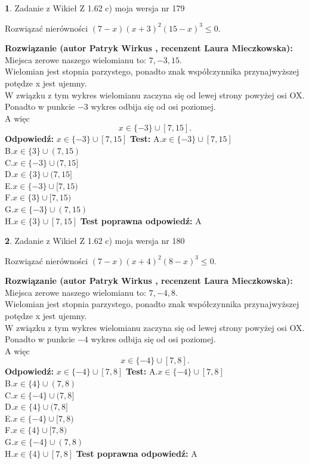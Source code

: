 \documentclass[12pt, a4paper]{article}
\theoremstyle{definition} %
\newtheorem{zad}{}
\newcommand{\zadStart}[1]{\begin{zad}#1\newline}
\newcommand{\zadStop}{\end{zad}}
\newcommand{\rozwStart}[2]{\noindent \textbf{Rozwiązanie (autor #1 , recenzent #2): }\newline}
\newcommand{\rozwStop}{\newline}
\newcommand{\odpStart}{\noindent \textbf{Odpowiedź:}\newline}
\newcommand{\odpStop}{\newline}
\newcommand{\testStart}{\noindent \textbf{Test:}\newline}
\newcommand{\testStop}{\newline}
\newcommand{\kluczStart}{\noindent \textbf{Test poprawna odpowiedź:}\newline}
\newcommand{\kluczStop}{\newline}
\begin{document}
\zadStart{Zadanie z Wikieł Z 1.62 c) moja wersja nr 179}

Rozwiązać nierówności $(7-x)(x+3)^{2}(15-x)^{3}\le0$.
\zadStop
\rozwStart{Patryk Wirkus}{Laura Mieczkowska}
Miejsca zerowe naszego wielomianu to: $7, -3, 15$.\\
Wielomian jest stopnia parzystego, ponadto znak współczynnika przy\linebreak najwyższej potędze x jest ujemny.\\ W związku z tym wykres wielomianu zaczyna się od lewej strony powyżej osi OX.\\
Ponadto w punkcie $-3$ wykres odbija się od osi poziomej.\\
A więc $$x \in \{-3\} \cup [7,15].$$
\rozwStop
\odpStart
$x \in \{-3\} \cup [7,15]$
\odpStop
\testStart
A.$x \in \{-3\} \cup [7,15]$\\
B.$x \in \{3\} \cup (7,15)$\\
C.$x \in \{-3\} \cup (7,15]$\\
D.$x \in \{3\} \cup (7,15]$\\
E.$x \in \{-3\} \cup [7,15)$\\
F.$x \in \{3\} \cup [7,15)$\\
G.$x \in \{-3\} \cup (7,15)$\\
H.$x \in \{3\} \cup [7,15]$
\testStop
\kluczStart
A
\kluczStop



\zadStart{Zadanie z Wikieł Z 1.62 c) moja wersja nr 180}

Rozwiązać nierówności $(7-x)(x+4)^{2}(8-x)^{3}\le0$.
\zadStop
\rozwStart{Patryk Wirkus}{Laura Mieczkowska}
Miejsca zerowe naszego wielomianu to: $7, -4, 8$.\\
Wielomian jest stopnia parzystego, ponadto znak współczynnika przy\linebreak najwyższej potędze x jest ujemny.\\ W związku z tym wykres wielomianu zaczyna się od lewej strony powyżej osi OX.\\
Ponadto w punkcie $-4$ wykres odbija się od osi poziomej.\\
A więc $$x \in \{-4\} \cup [7,8].$$
\rozwStop
\odpStart
$x \in \{-4\} \cup [7,8]$
\odpStop
\testStart
A.$x \in \{-4\} \cup [7,8]$\\
B.$x \in \{4\} \cup (7,8)$\\
C.$x \in \{-4\} \cup (7,8]$\\
D.$x \in \{4\} \cup (7,8]$\\
E.$x \in \{-4\} \cup [7,8)$\\
F.$x \in \{4\} \cup [7,8)$\\
G.$x \in \{-4\} \cup (7,8)$\\
H.$x \in \{4\} \cup [7,8]$
\testStop
\kluczStart
A
\kluczStop
\end{document}

